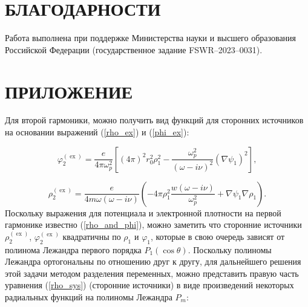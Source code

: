 \documentclass[12pt, a4paper]{article}
\def \w {\omega}
\def \ph {\varphi}
\def \ex { \operatorname{ex}}
\begin{document}
\section{БЛАГОДАРНОСТИ}
Работа выполнена при поддержке Министерства науки и высшего образования Российской Федерации (государственное задание FSWR–2023–0031).
\newpage

\appendix
\section*{\hfill ПРИЛОЖЕНИЕ}


Для второй гармоники, можно получить вид функций для сторонних источников на основании выражений (\ref{rho_ex}) и (\ref{phi_ex}):

\begin{equation} 	
 \ph^{(\ex)}_2 = \frac{e}{4 \pi \w_p^2}[(4\pi)^2r_0^2\rho_1^2 - \frac{\w_p^2}{(\w - i \nu)^2}(\nabla \psi_1)^2], 
\end{equation}

\begin{equation} 	
\rho^{(\ex)}_2 = \frac{e}{4 m \w(\w - i \nu)}(-4 \pi \rho_1^2 \frac{w(\w - i \nu)}{\w_p^2} + \nabla \psi_1\nabla \rho_1).
\end{equation}
Поскольку выражения для потенциала и электронной плотности на первой гармонике известно (\ref{rho_and_phi}), можно заметить что сторонние источники $\rho^{(\ex)}_2$, $\ph^{(\ex)}_2$ квадратичны по $\rho_1$ и $\ph_1$, которые в свою очередь зависят от полинома Лежандра первого порядка $P_1(\cos\theta)$. Поскольку полиномы Лежандра ортогональны по отношению друг к другу, для дальнейшего решения этой задачи методом разделения переменных, можно представить правую часть уравнения (\ref{rho_sys}) (сторонние источники) в виде произведений некоторых радиальных функций на
полиномы Лежандра $P_m$:
\end{document}
